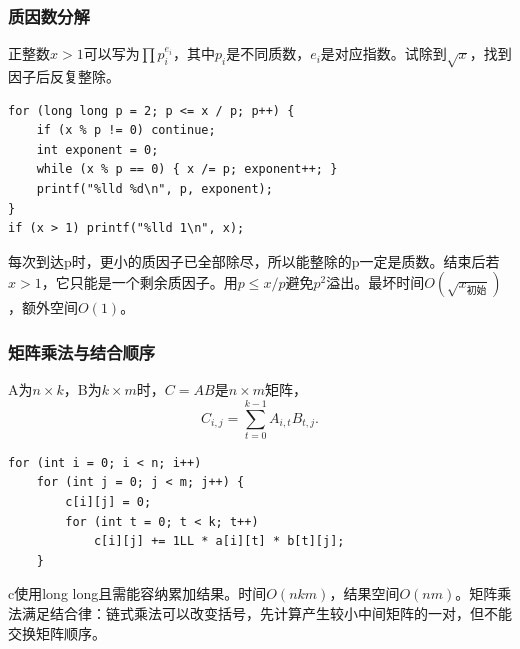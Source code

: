 \subsubsection{质因数分解}
正整数$x>1$可以写为$\prod p_i^{e_i}$，其中$p_i$是不同质数，$e_i$是对应指数。试除到$\sqrt{x}$，找到因子后反复整除。
\begin{lstlisting}
for (long long p = 2; p <= x / p; p++) {
    if (x % p != 0) continue;
    int exponent = 0;
    while (x % p == 0) { x /= p; exponent++; }
    printf("%lld %d\n", p, exponent);
}
if (x > 1) printf("%lld 1\n", x);
\end{lstlisting}
每次到达p时，更小的质因子已全部除尽，所以能整除的p一定是质数。结束后若$x>1$，它只能是一个剩余质因子。用$p\le x/p$避免$p^2$溢出。最坏时间$O(\sqrt{x_{\text{初始}}})$，额外空间$O(1)$。
\subsubsection{矩阵乘法与结合顺序}
A为$n\times k$，B为$k\times m$时，$C=AB$是$n\times m$矩阵，
\[
C_{i,j}=\sum_{t=0}^{k-1}A_{i,t}B_{t,j}.
\]
\begin{lstlisting}
for (int i = 0; i < n; i++)
    for (int j = 0; j < m; j++) {
        c[i][j] = 0;
        for (int t = 0; t < k; t++)
            c[i][j] += 1LL * a[i][t] * b[t][j];
    }
\end{lstlisting}
c使用long long且需能容纳累加结果。时间$O(nkm)$，结果空间$O(nm)$。矩阵乘法满足结合律：链式乘法可以改变括号，先计算产生较小中间矩阵的一对，但不能交换矩阵顺序。
